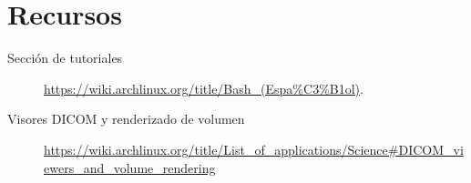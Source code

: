 \documentclass[9pt,a3paper]{scrartcl}
\begin{document}
\section*{\Huge Recursos}

\begin{description}
	\item[Sección de tutoriales]
		\url{https://wiki.archlinux.org/title/Bash_(Espa%C3%B1ol)}.
	\item[Visores DICOM y renderizado de volumen]
		\url{https://wiki.archlinux.org/title/List_of_applications/Science#DICOM_viewers_and_volume_rendering}
\end{description}

\vfill

\end{document}
